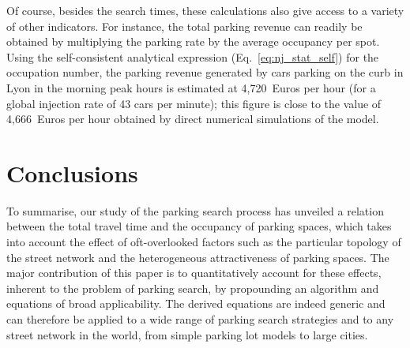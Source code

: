 \documentclass[trsc,reprint]{informs3}
\newcommand{\AN}[1]{#1}
\begin{document}
\AN{
Of course, besides the search times, these calculations also give access to a variety of other indicators. For instance,
the total parking revenue can readily be obtained
by multiplying the parking rate by the average occupancy per spot. Using the self-consistent analytical expression (Eq.~\ref{eq:nj_stat_self}) for the occupation number, the parking revenue generated by cars parking on the curb in Lyon in the morning peak hours is estimated at 4,720~Euros per hour (for a global injection rate of 43 cars per minute); this figure is close to the value of 4,666~Euros per hour obtained by direct numerical simulations of the model.
}



\section{Conclusions}

To summarise, our study of the parking search process has unveiled a relation between the total travel time and the occupancy of parking spaces, which takes into account the effect of oft-overlooked factors such as the particular topology of the street network and the \AN{heterogeneous} attractiveness of parking spaces. 
\AN{The major contribution of this paper is to quantitatively account for these effects, inherent to the problem of
parking search, by propounding an algorithm and equations of broad applicability.}
The derived equations are \AN{indeed} generic and can therefore be applied to \AN{a wide range of} parking search strategies and to any street network in the world, from simple parking lot models to large cities.
\end{document}

